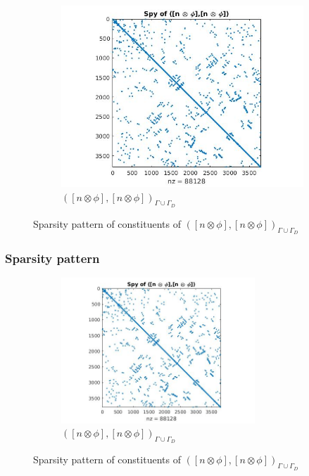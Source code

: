 \documentclass{beamer}
\begin{document}
\begin{frame}
\begin{figure}
\begin{subfigure}{\textwidth}
  \includegraphics[width=\textwidth]{figure2.jpg}
  \caption{$([n \otimes \phi],[n \otimes \phi])_{\Gamma \cup \Gamma_D}$}
  \label{fig:figure2}
\end{subfigure}
\caption{Sparsity pattern of constituents of $([n \otimes \phi],[n \otimes \phi])_{\Gamma \cup \Gamma_D}$}
\label{figure_2_all}
\end{figure}

\end{frame}

\begin{frame}
\frametitle{Sparsity pattern}
\begin{figure}
  \begin{subfigure}{0.8\textwidth}	
\centering
  \includegraphics[width=0.8\textwidth]{figure2.jpg}
  \caption{$([n \otimes \phi],[n \otimes \phi])_{\Gamma \cup \Gamma_D}$}
  \label{fig:figure2}
\end{subfigure}
\caption{Sparsity pattern of constituents of $([n \otimes \phi],[n \otimes \phi])_{\Gamma \cup \Gamma_D}$}
\label{figure_2_all}
\end{figure}
\end{frame}
\end{document}
